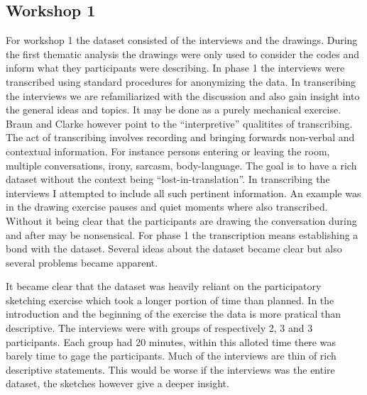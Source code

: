 \documentclass[11pt,UKenglish, a4paper]{article}
\begin{document}
\subsection{Workshop 1} 
For workshop 1 the dataset consisted of the interviews and the drawings. During the first thematic analysis the drawings were only used to consider the codes and inform what they participants were describing. In phase 1 the interviews were transcribed using standard procedures for anonymizing the data. In transcribing the interviews we are refamiliarized with the discussion and also gain insight into the general ideas and topics. It may be done as a purely mechanical exercise. Braun and Clarke however point to the ``interpretive''\cite[p.88]{Braun2006Using} qualitites of transcribing. The act of transcribing involves recording and bringing forwards non-verbal and contextual information. For instance persons entering or leaving the room, multiple conversations, irony, sarcasm, body-language. The goal is to have a rich dataset without the context being ``lost-in-translation''. In transcribing the interviews I attempted to include all such pertinent information. An example was in the drawing exercise pauses and quiet moments where also transcribed. Without it being clear that the participants are drawing the conversation during and after may be nonsensical. For phase 1 the transcription means establishing a bond with the dataset. Several ideas about the dataset became clear but also several problems became apparent. 

It became clear that the dataset was heavily reliant on the participatory sketching exercise which took a longer portion of time than planned. In the introduction and the beginning of the exercise the data is more pratical than descriptive. The interviews were with groups of respectively 2, 3 and 3 participants. Each group had 20 minutes, within this alloted time there was barely time to gage the participants. Much of the interviews are thin of rich descriptive statements. This would be worse if the interviews was the entire dataset, the sketches however give a deeper insight. 
\end{document}
